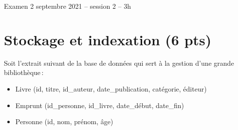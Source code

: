 
%
{Examen 2 septembre 2021 -- session 2 -- 3h}%
{\empty}%

\section{Stockage et indexation (6 pts)}

Soit l'extrait suivant de la base de données qui sert à la gestion d'une grande
 bibliothèque\,:

\begin{itemize}
  \item Livre (id, titre, id\_auteur, date\_publication, catégorie, éditeur)
  \item Emprunt (id\_personne, id\_livre, date\_début, date\_fin)
  \item Personne  (id, nom, prénom, âge)
\end{itemize}

